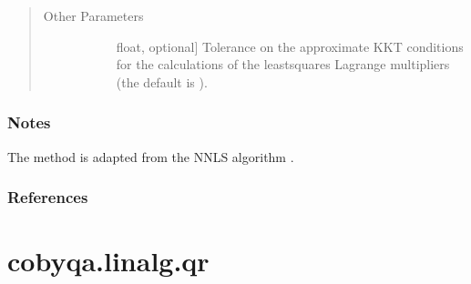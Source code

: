 \documentclass[letterpaper,10pt,english]{sphinxmanual}
\begin{document}
\begin{fulllineitems}
\begin{quote}
\begin{description}
\begin{description}
\end{description}

\item[{Other Parameters}] \leavevmode\begin{description}
\item[{}] \leavevmode{[}float, optional{]}
\sphinxAtStartPar
Tolerance on the approximate KKT conditions for the calculations of the
least\sphinxhyphen{}squares Lagrange multipliers (the default is
).

\end{description}

\end{description}\end{quote}
\subsubsection*{Notes}

\sphinxAtStartPar
The method is adapted from the NNLS algorithm .
\subsubsection*{References}

\sphinxAtStartPar
{}

\end{fulllineitems}



\section{cobyqa.linalg.qr}
\label{\detokenize{refs/generated/cobyqa.linalg.qr:cobyqa-linalg-qr}}\label{\detokenize{refs/generated/cobyqa.linalg.qr::doc}}
\end{document}
